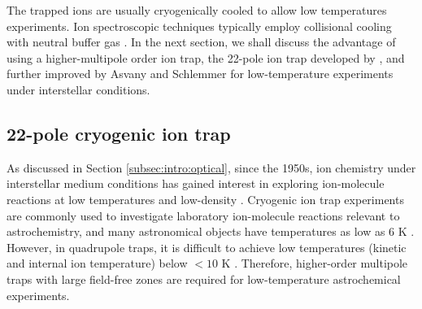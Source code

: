 The trapped ions are usually cryogenically cooled to allow low temperatures experiments. Ion spectroscopic techniques typically employ collisional cooling with neutral buffer gas \cite{dehmelt_radiofrequency_1968, wester_radiofrequency_2009}. In the next section, we shall discuss the advantage of using a higher-multipole order ion trap, the 22-pole ion trap developed by \citet{gerlich_ion-neutral_1995}, and further improved by Asvany and Schlemmer \cite{asvany_note_2010} for low-temperature experiments under interstellar conditions.

\subsection{22-pole cryogenic ion trap}
\label{subsec:22-pole}

As discussed in Section \ref{subsec:intro:optical}, since the 1950s, ion chemistry under interstellar medium conditions has gained interest in exploring ion-molecule reactions at low temperatures and low-density \cite{smith_ion_1992, gerlich_experimental_1992}. Cryogenic ion trap experiments are commonly used to investigate laboratory ion-molecule reactions relevant to astrochemistry, and many astronomical objects have temperatures as low as 6 K \cite{harju_detection_2008}. However, in quadrupole traps, it is difficult to achieve low temperatures (kinetic and internal ion temperature) below $<10$ K \cite{gerlich_inhomogeneous_1992}. Therefore, higher-order multipole traps with large field-free zones are required for low-temperature astrochemical experiments.\\

